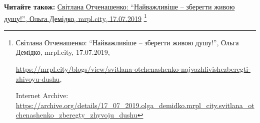  
 
 
 
 

\def\pubIA{https://archive.org/details/17_07_2019.olga_demidko.mrpl_city.svitlana_otchenashenko_zberegty_zhyvoju_dushu}
\def\pubTitle{Світлана Отченашенко: \enquote{Найважливіше – зберегти живою душу!}}
\def\pubDate{17.07.2019}
\def\pubOrigin{https://mrpl.city/blogs/view/svitlana-otchenashenko-najvazhlivishezberegti-zhivoyu-dushu}
\def\pubAuthor{Ольга Демідко}

\textbf{Читайте також:} \href{\pubIA}{%
\pubTitle, \pubAuthor, mrpl.city, \pubDate}%
\footnote{\pubTitle, \pubAuthor, mrpl.city, \pubDate, \par\url{\pubOrigin}, \par Internet Archive: \url{\pubIA}}
